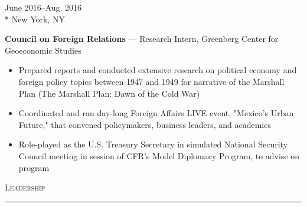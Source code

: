 \documentclass[a4paper,9pt]{article}
\begin{document}
\vspace{-3ex}
\begin{minipage}[t]{0.20\linewidth}
	\begin{small}
		\begin{spacing}{1.10}
			\begin{flushright}
				June 2016--Aug. 2016
				\\*
				\vspace*{2.5pt}
				New York, NY
			\end{flushright}
		\end{spacing}
	\end{small}
\end{minipage}
\hspace{4mm}
\begin{minipage}[t]{0.75\linewidth}
	\begin{small}
		\begin{spacing}{1.10}
			\begin{flushleft}
				\textbf{Council on Foreign Relations} --- Research Intern, Greenberg Center for Geoeconomic Studies
				\begin{itemize}[itemsep=0pt,topsep=2.5pt,leftmargin=*]
					\item Prepared reports and conducted extensive research on political economy and foreign policy topics between 1947 and 1949 for narrative of the Marshall Plan (The Marshall Plan: Dawn of the Cold War)
					\item Coordinated and ran day-long Foreign Affairs LIVE event, "Mexico's Urban Future," that convened policymakers, business leaders, and academics
					\item Role-played as the U.S. Treasury Secretary in simulated National Security Council meeting in session of CFR's Model Diplomacy Program, to advise on program
				\end{itemize}
			\end{flushleft}
		\end{spacing}
	\end{small}
\end{minipage}

\vspace{-6ex}
\vspace*{25pt}

\begin{Large}
	\textsc{Leadership}
\end{Large}
\vspace*{5pt}
\hrule
\vspace*{5pt}
\end{document}

